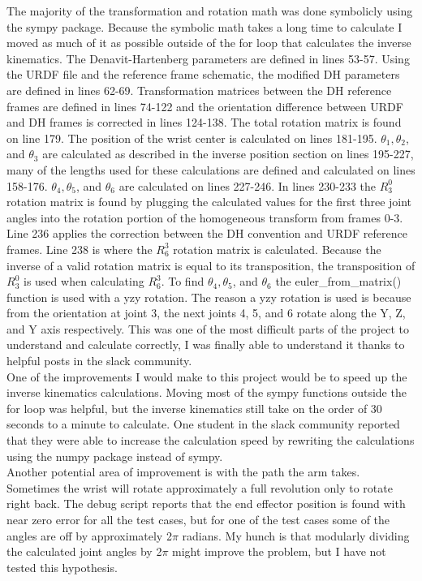 \documentclass{article}
\begin{document}
The majority of the transformation and rotation math was done symbolicly using the sympy package. Because the symbolic math takes a long time to calculate I moved as much of it as possible outside of the for loop that calculates the inverse kinematics.
The Denavit-Hartenberg parameters are defined in lines 53-57. Using the URDF file and the reference frame schematic, the modified DH parameters are defined in lines 62-69. Transformation matrices between the DH reference frames are defined in lines 74-122 and the orientation difference between URDF and DH frames is corrected in lines 124-138. The total rotation matrix is found on line 179. The position of the wrist center is calculated on lines 181-195. 
$\theta _1, \theta _2$, and $\theta _3$ are calculated as described in the inverse position section on lines 195-227, many of the lengths used for these calculations are defined and calculated on lines 158-176.
$\theta _4, \theta _5$, and $\theta _6$ are calculated on lines 227-246. In lines 230-233 the $R^0_3$ rotation matrix is found by plugging the calculated values for the first three joint angles into the rotation portion of the homogeneous transform from frames 0-3. Line 236 applies the correction between the DH convention and URDF reference frames. Line 238 is where the $R^3_6$ rotation matrix is calculated. Because the inverse of a valid rotation matrix is equal to its transposition, the transposition of $R^0_3$ is used when calculating $R^3_6$.
To find $\theta _4, \theta _5$, and $\theta _6$ the euler\_from\_matrix() function is used with a yzy rotation. The reason a yzy rotation is used is because from the orientation at joint 3, the next joints 4, 5, and 6 rotate along the Y, Z, and Y axis respectively. This was one of the most difficult parts of the project to understand and calculate correctly, I was finally able to understand it thanks to helpful posts in the slack community. \\
One of the improvements I would make to this project would be to speed up the inverse kinematics calculations. Moving most of the sympy functions outside the for loop was helpful, but the inverse kinematics still take on the order of 30 seconds to a minute to calculate. One student in the slack community reported that they were able to increase the calculation speed by rewriting the calculations using the numpy package instead of sympy. \\
Another potential area of improvement is with the path the arm takes. Sometimes the wrist will rotate approximately a full revolution only to rotate right back. The debug script reports that the end effector position is found with near zero error for all the test cases, but for one of the test cases some of the angles are off by approximately 2$\pi$ radians. My hunch is that modularly dividing the calculated joint angles by 2$\pi$ might improve the problem, but I have not tested this hypothesis.
\end{document}
